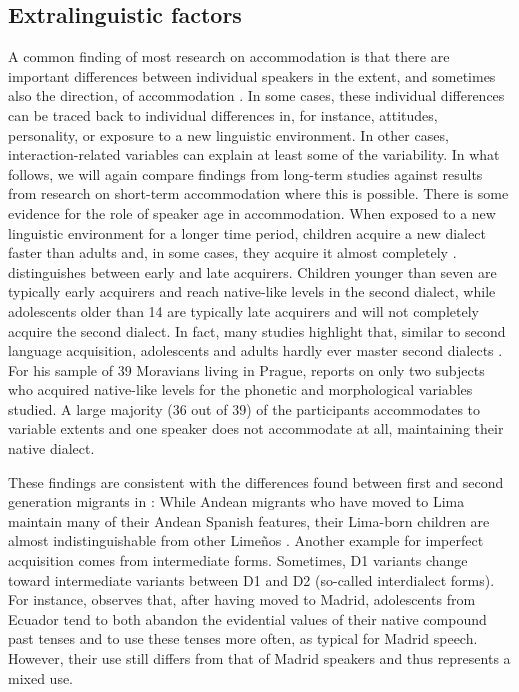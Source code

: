 \documentclass[output=paper]{langscibook}
\begin{document}
\subsection{Extralinguistic factors} \label{subsec_extralinguistic}
A common finding of most research on accommodation is that there are important differences between individual speakers in the extent, and sometimes also the direction, of accommodation \citep[e.g. ][]{yu_origins_2013,macleod_effect_2012,babel_evidence_2012,werlen_zwischen_2006,evans_plasticity_2007}. In some cases, these individual differences can be traced back to individual differences in, for instance, attitudes, personality, or exposure to a new linguistic environment. In other cases, interaction-related variables can explain at least some of the variability. In what follows, we will again compare findings from long-term studies against results from research on short-term accommodation where this is possible. There is some evidence for the role of speaker age in accommodation. When exposed to a new linguistic environment for a longer time period, children acquire a new dialect faster than adults and, in some cases, they acquire it almost completely \citep{chambers_dialect_1992,siegel_second_2010,tagliamonte_howd_2007}.  \citet{chambers_dialect_1992} distinguishes between early and late acquirers. Children younger than seven are typically early acquirers and reach native-like levels in the second dialect, while adolescents older than 14 are typically late acquirers and will not completely acquire the second dialect. In fact, many studies highlight that, similar to second language acquisition, adolescents and adults hardly ever master second dialects \citep{siegel_second_2010}. For his sample of 39 Moravians living in Prague, \textcite{wilson_types_2011} reports on only two subjects who acquired native-like levels for the phonetic and morphological variables studied. A large majority (36 out of 39) of the participants accommodates to variable extents and one speaker does not accommodate at all, maintaining their native dialect.

These findings are consistent with the differences found between first and second generation migrants in \textcite{klee_andean_2006}: While Andean migrants who have moved to Lima maintain many of their Andean Spanish features, their Lima-born children are almost indistinguishable from other Limeños \parencite[ the linguistic effect of having non-native parents, see][]{payne_factors_1980}. Another example for imperfect acquisition comes from intermediate forms. Sometimes, D1 variants change toward intermediate variants between D1 and D2 (so-called interdialect forms). For instance, \citet{PalaciosAlcaine2007} observes that, after having moved to Madrid, adolescents from Ecuador tend to both abandon the evidential values of their native compound past tenses and to use these tenses more often, as typical for Madrid speech. However, their use still differs from that of Madrid speakers and thus represents a mixed use.
\end{document}
